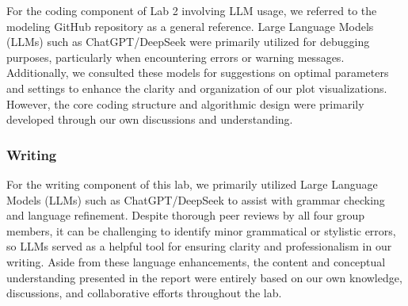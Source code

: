 \documentclass[11pt,letterpaper]{article}
\begin{document}
For the coding component of Lab 2 involving LLM usage, we referred to the modeling GitHub repository as a general reference. Large Language Models (LLMs) such as ChatGPT/DeepSeek were primarily utilized for debugging purposes, particularly when encountering errors or warning messages. Additionally, we consulted these models for suggestions on optimal parameters and settings to enhance the clarity and organization of our plot visualizations. However, the core coding structure and algorithmic design were primarily developed through our own discussions and understanding.

\vspace{1em} %
\subsubsection*{Writing}
\vspace{0.5em} %

For the writing component of this lab, we primarily utilized Large Language Models (LLMs) such as ChatGPT/DeepSeek to assist with grammar checking and language refinement. Despite thorough peer reviews by all four group members, it can be challenging to identify minor grammatical or stylistic errors, so LLMs served as a helpful tool for ensuring clarity and professionalism in our writing. Aside from these language enhancements, the content and conceptual understanding presented in the report were entirely based on our own knowledge, discussions, and collaborative efforts throughout the lab.
\end{document}
